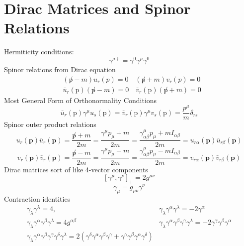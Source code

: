 \section{Dirac Matrices and Spinor Relations}
Hermiticity conditions:
\begin{equation}
\gamma^{\mu \dagger}=\gamma^{0} \gamma^{\mu} \gamma^{0}
\end{equation}
Spinor relations from Dirac equation
\begin{equation}
\begin{aligned}
&(\not p-m) u_{r}(p)=0 \quad(\not p+m) v_{r}(p)=0\\
&\bar{u}_{r}(\mathrm{p})(\not p-m)=0 \quad \bar{v}_{r}(\mathrm{p})(\not p+m)=0
\end{aligned}
\end{equation}
Most General Form of Orthonormality Conditions
\begin{equation}
\bar{u}_{r}(\mathrm{p}) \gamma^{\mu} u_{s}(\mathrm{p})=\bar{v}_{r}(\mathrm{p}) \gamma^{\mu} v_{s}(\mathrm{p})=\frac{p^{\mu}}{m} \delta_{r s}
\end{equation}
Spinor outer product relations
\begin{equation}
u_{r}(\mathbf{p}) \bar{u}_{r}(\mathbf{p})=\frac{\not p+m}{2 m}=\frac{\gamma^{\mu} p_{\mu}+m}{2 m}=\frac{\gamma_{\alpha \beta}^{\mu} p_{\mu}+m I_{\alpha \beta}}{2 m}=u_{r \alpha}(\mathbf{p}) \bar{u}_{r \beta}(\mathbf{p})
\end{equation}
\begin{equation}
v_{r}(\mathbf{p}) \bar{v}_{r}(\mathbf{p})=\frac{\not p-m}{2 m}=\frac{\gamma^{\mu} p_{\mu}-m}{2 m}=\frac{\gamma_{\alpha \beta}^{\mu} p_{\mu}-m I_{\alpha \beta}}{2 m}=v_{r \alpha}(\mathbf{p}) \bar{v}_{r \beta}(\mathbf{p})
\end{equation}
Dirac matrices sort of like 4-vector components
\begin{equation}
\left[\gamma^{\mu}, \gamma^{\nu}\right]_{+}=2 g^{\mu \nu}
\end{equation}
\begin{equation}
\gamma_{\mu}=g_{\mu \nu} \gamma^{\nu}
\end{equation}
Contraction identities
\begin{equation}
\begin{array}{ll}
{\gamma_{\lambda} \gamma^{\lambda}=4,} & {\gamma_{\lambda} \gamma^{\alpha} \gamma^{\lambda}=-2 \gamma^{\alpha}} \\
{\gamma_{\lambda} \gamma^{\alpha} \gamma^{\beta} \gamma^{\lambda}=4 g^{\alpha \beta}} & {\gamma_{\lambda} \gamma^{\alpha} \gamma^{\beta} \gamma^{\gamma} \gamma^{\lambda}=-2 \gamma^{\gamma} \gamma^{\beta} \gamma^{\alpha}} \\
{\gamma_{\lambda} \gamma^{\alpha} \gamma^{\beta} \gamma^{\gamma} \gamma^{\delta} \gamma^{\lambda}=2\left(\gamma^{\delta} \gamma^{\alpha} \gamma^{\beta} \gamma^{\gamma}+\gamma^{\gamma} \gamma^{\beta} \gamma^{\alpha} \gamma^{\delta}\right)}
\end{array}
\end{equation}
